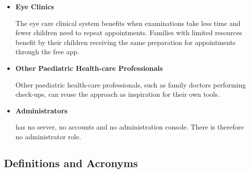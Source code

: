 \documentclass[10pt]{article}
\begin{document}
\begin{itemize}
\item \textbf{Eye Clinics} 

The eye care clinical system benefits when examinations take less time and fewer children need 
to repeat appointments. Families with limited resources benefit by their children receiving the same preparation 
for appointments through the free app. 

\item \textbf{Other Paediatric Health-care Professionals} 

Other paediatric health-care professionals, such as family doctors performing check-ups, can reuse the approach as inspiration for their own tools.

\item \textbf{Administrators} 

\progname{} has no server, no accounts and no administration console. There is
therefore no administrator role.
\end{itemize}

\subsection{Definitions and Acronyms} \label{sec_DefinitionsAndAcronyms}

\renewcommand{\arraystretch}{1.3}
\end{document}
